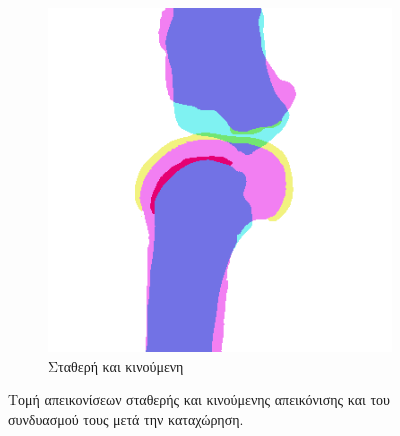 \documentclass[a4paper,12pt]{article}
\begin{document}
\begin{figure}[H]
    \begin{subfigure}[t]{0.4\linewidth}
    \includegraphics[width=\linewidth]{combination_label_before_registration_1.png}
    \caption{Σταθερή και κινούμενη}
    \end{subfigure}

    \caption{Τομή απεικονίσεων σταθερής και κινούμενης απεικόνισης και του
             συνδυασμού τους μετά την καταχώρηση.}
    \label{fig:registration_before:1}
\end{figure}
\end{document}
